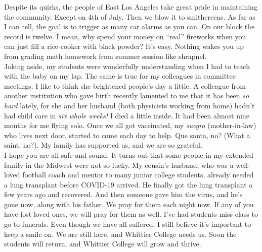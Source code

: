 \documentclass[../../main.tex]{subfiles}
\begin{document}
\vspace{0.25cm}
Despite its quirks, the people of East Los Angeles take great pride in maintaining the community.  Except on 4th of July.  Then we blow it to smithereens.  As far as I can tell, the goal is to trigger as many car alarms as you can.  On our block the record is twelve.  I mean, why spend your money on ``real'' fireworks when you can just fill a rice-cooker with black powder?  It's easy.  Nothing wakes you up from grading math homework from summer session like shrapnel.
\\
\vspace{0.25cm}
Joking aside, my students were wonderfully understanding when I had to teach with the baby on my lap.  The same is true for my colleagues in committee meetings.  I like to think she brightened people's day a little.  A colleague from another institution who gave birth recently lamented to me that it has been \textit{so hard} lately, for she and her husband (both physicists working from home) hadn't had child care in \textit{six whole weeks!}  I died a little inside.  It had been almost nine months for me flying solo.  Once we all got vaccinated, my \textit{suegra} (mother-in-law) who lives next door, started to come each day to help.  Que santa, no? (What a saint, no?).  My family has supported us, and we are so grateful.
\\
\vspace{0.25cm}
I hope you are all safe and sound.  It turns out that some people in my extended family in the Midwest were not so lucky.  My cousin's husband, who was a well-loved football coach and mentor to many junior college students, already needed a lung transplant before COVID-19 arrived.  He finally got the lung transplant a few years ago and recovered.  And then someone gave him the virus, and he's gone now, along with his father.  We pray for them each night now.  If any of you have lost loved ones, we will pray for them as well.  I've had students miss class to go to funerals.  Even though we have all suffered, I still believe it's important to keep a smile on.  We are still here, and Whittier College needs us.  Soon the students will return, and Whittier College will grow and thrive.
\end{document}
